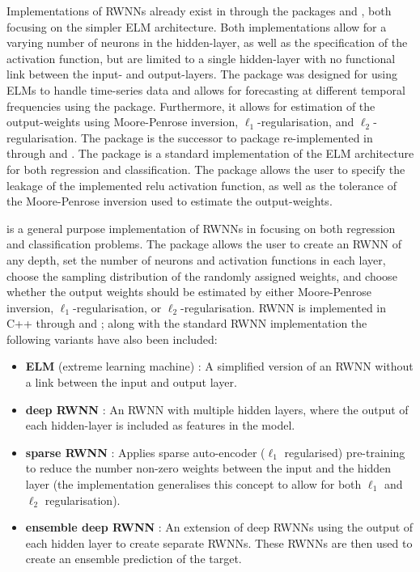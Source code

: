 \documentclass[
]{jss}
\providecommand{\tightlist}{%
  \setlength{\itemsep}{0pt}\setlength{\parskip}{0pt}}
\begin{document}
Implementations of RWNNs already exist in  through the
packages  \citep{nnfor} and 
\citep{elmNNRcpp}, both focusing on the simpler ELM architecture. Both
implementations allow for a varying number of neurons in the
hidden-layer, as well as the specification of the activation function,
but are limited to a single hidden-layer with no functional link between
the input- and output-layers. The  package was designed for
using ELMs to handle time-series data and allows for forecasting at
different temporal frequencies using the  package.
Furthermore, it allows for estimation of the output-weights using
Moore-Penrose inversion, \(\ell_1\)-regularisation, and
\(\ell_2\)-regularisation. The  package is the successor
to  package \citep{elmNN} re-implemented in 
through  and  \citep[\citet{RcppA}]{Rcpp}.
The package is a standard implementation of the ELM architecture for
both regression and classification. The package allows the user to
specify the leakage of the implemented relu activation function, as well
as the tolerance of the Moore-Penrose inversion used to estimate the
output-weights.

 is a general purpose implementation of RWNNs in 
\citep{R} focusing on both regression and classification problems. The
 package allows the user to create an RWNN of any depth, set
the number of neurons and activation functions in each layer, choose the
sampling distribution of the randomly assigned weights, and choose
whether the output weights should be estimated by either Moore-Penrose
inversion, \(\ell_1\)-regularisation, or \(\ell_2\)-regularisation. RWNN
is implemented in C++ through  and ; along
with the standard RWNN implementation the following variants have also
been included:

\begin{itemize}
\tightlist
\item
  \textbf{ELM} (extreme learning machine) \citep{Huang2006}: A
  simplified version of an RWNN without a link between the input and
  output layer.
\item
  \textbf{deep RWNN} \citep[\citet{Shi2021}]{Henriquez2018}: An RWNN
  with multiple hidden layers, where the output of each hidden-layer is
  included as features in the model.
\item
  \textbf{sparse RWNN} \citep{Zhang2019}: Applies sparse auto-encoder
  (\(\ell_1\) regularised) pre-training to reduce the number non-zero
  weights between the input and the hidden layer (the implementation
  generalises this concept to allow for both \(\ell_1\) and \(\ell_2\)
  regularisation).
\item
  \textbf{ensemble deep RWNN} \citep{Shi2021}: An extension of deep
  RWNNs using the output of each hidden layer to create separate RWNNs.
  These RWNNs are then used to create an ensemble prediction of the
  target.
\end{itemize}
\end{document}

